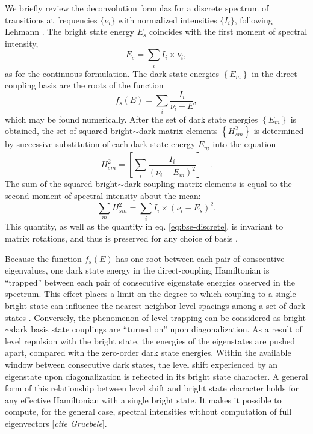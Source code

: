 \documentclass[12pt]{mitthesis}
\begin{document}
We briefly review the deconvolution formulas for a discrete spectrum
of transitions at frequencies $\lbrace \nu_i \rbrace$ with normalized
intensities $\lbrace I_i \rbrace$, following Lehmann \cite{lehmann91}.
The bright state energy $E_s$ coincides with the first moment of
spectral intensity,
\begin{equation}
  \label{eq:bse-discrete}
  E_s = \sum_i I_i \times \nu_i,
\end{equation}
as for the continuous formulation.  The dark state energies $\left
  \lbrace E_m \right \rbrace$ in the direct-coupling basis are the
roots of the function
\begin{equation}
  f_s(E) = \sum_i \frac{I_i}{\nu_i - E},
\end{equation}
which may be found numerically.  After the set of dark state energies
$\left \lbrace E_m \right \rbrace$ is obtained, the set of squared
bright$\sim$dark matrix elements $\left \lbrace H_{sm}^2 \right
\rbrace$ is determined by successive substitution of each dark state
energy $E_m$ into the equation
\begin{equation}
  H_{sm}^2 = 
  \left [
    \sum_i \frac{I_i}{(\nu_i - E_m)^2}
  \right ]^{-1}.
\end{equation}
The sum of the squared bright$\sim$dark coupling matrix elements is
equal to the second moment of spectral intensity about the mean:
\begin{equation}
  \label{eq:me-sum-discrete}
  \sum_m H_{sm}^2 = \sum_i I_i \times (\nu_i - E_s)^2.
\end{equation}
This quantity, as well as the quantity in eq. \ref{eq:bse-discrete},
is invariant to matrix rotations, and thus is preserved for any choice
of basis \cite{lehmann91}.

Because the function $f_s(E)$ has one root between each pair of
consecutive eigenvalues, one dark state energy in the direct-coupling
Hamiltonian is ``trapped'' between each pair of consecutive eigenstate
energies observed in the spectrum.  This effect places a limit on the
degree to which coupling to a single bright state can influence the
nearest-neighbor level spacings among a set of dark states
\cite{coy87}.  Conversely, the phenomenon of level trapping can be
considered as bright$\sim$dark basis state couplings are ``turned on''
upon diagonalization.  As a result of level repulsion with the bright
state, the energies of the eigenstates are pushed apart, compared with
the zero-order dark state energies.  Within the available window
between consecutive dark states, the level shift experienced by an
eigenstate upon diagonalization is reflected in its bright state
character.  A general form of this relationship between level shift
and bright state character holds for any effective Hamiltonian with a
single bright state.  It makes it possible to compute, for the general
case, spectral intensities without computation of full eigenvectors
[\emph{cite Gruebele}].
\end{document}
